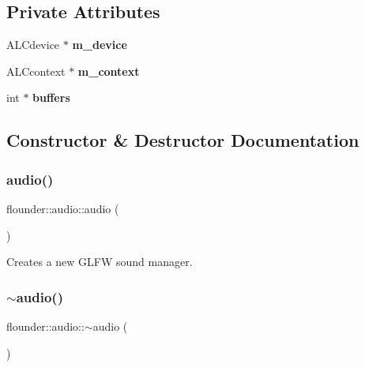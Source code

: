\subsection*{Private Attributes}
\begin{DoxyCompactItemize}
\item 
\mbox{\label{classflounder_1_1audio_a6e577784668fbd39f2d6aa8e45bd2983}} 
A\+L\+Cdevice $\ast$ {\bfseries m\+\_\+device}
\item 
\mbox{\label{classflounder_1_1audio_a361e675d6029769f9a366354a3e1cb61}} 
A\+L\+Ccontext $\ast$ {\bfseries m\+\_\+context}
\item 
\mbox{\label{classflounder_1_1audio_a58379153a6620d70633e20b4660502ea}} 
int $\ast$ {\bfseries buffers}
\end{DoxyCompactItemize}


\subsection{Constructor \& Destructor Documentation}
\mbox{\label{classflounder_1_1audio_a0aabbb226f542847145d89adb1144c16}} 
\subsubsection{\texorpdfstring{audio()}{audio()}}
{\footnotesize\ttfamily flounder\+::audio\+::audio (\begin{DoxyParamCaption}{ }\end{DoxyParamCaption})}



Creates a new G\+L\+FW sound manager. 

\mbox{\label{classflounder_1_1audio_afb4d3bbb9ae399385a3abfe6e4e6d7ee}} 
\subsubsection{\texorpdfstring{$\sim$audio()}{~audio()}}
{\footnotesize\ttfamily flounder\+::audio\+::$\sim$audio (\begin{DoxyParamCaption}{ }\end{DoxyParamCaption})}



